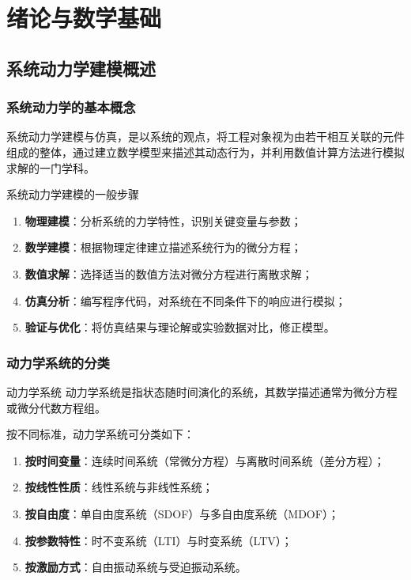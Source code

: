 \chapter{绪论与数学基础}


\section{系统动力学建模概述}

\subsection{系统动力学的基本概念}

系统动力学建模与仿真，是以系统的观点，将工程对象视为由若干相互关联的元件组成的整体，通过建立数学模型来描述其动态行为，并利用数值计算方法进行模拟求解的一门学科。

\begin{myTheorem}{系统动力学建模的一般步骤}
	\begin{enumerate}
		\item \textbf{物理建模}：分析系统的力学特性，识别关键变量与参数；
		\item \textbf{数学建模}：根据物理定律建立描述系统行为的微分方程；
		\item \textbf{数值求解}：选择适当的数值方法对微分方程进行离散求解；
		\item \textbf{仿真分析}：编写程序代码，对系统在不同条件下的响应进行模拟；
		\item \textbf{验证与优化}：将仿真结果与理论解或实验数据对比，修正模型。
	\end{enumerate}
\end{myTheorem}

\subsection{动力学系统的分类}

\begin{mydefinition}{动力学系统}
	动力学系统是指状态随时间演化的系统，其数学描述通常为微分方程或微分代数方程组。
\end{mydefinition}

按不同标准，动力学系统可分类如下：
\begin{enumerate}
	\item \textbf{按时间变量}：连续时间系统（常微分方程）与离散时间系统（差分方程）；
	\item \textbf{按线性性质}：线性系统与非线性系统；
	\item \textbf{按自由度}：单自由度系统（SDOF）与多自由度系统（MDOF）；
	\item \textbf{按参数特性}：时不变系统（LTI）与时变系统（LTV）；
	\item \textbf{按激励方式}：自由振动系统与受迫振动系统。
\end{enumerate}

